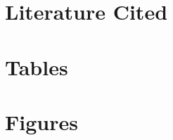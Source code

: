 \documentclass[12pt,english]{article}
\begin{document}
\clearpage
\section*{Literature Cited}
\renewcommand{\refname}{}
\vspace{-1cm}




\newpage
\section*{Tables}

%


\newpage
\section*{Figures}
\end{document}

